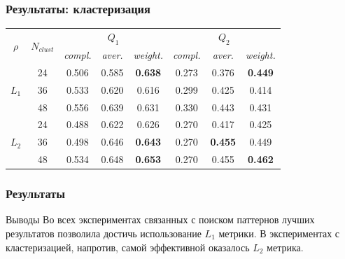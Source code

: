 \documentclass{beamer}
\begin{document}

\begin{frame}
    \frametitle{Результаты: кластеризация}   
    \begin{table}[h]
        \centering
        \begin{tabular}{c|c *{2}{|*{3}{c}}}
            \toprule
             &  &  &  \\
            \cmidrule(r){3-8}
            && \textit{compl.} & \textit{aver.} & \textit{weight.} & \textit{compl.} & \textit{aver.} & \textit{weight.} \\
            \midrule
                & 24    &   0.506  &   0.585 &    \textbf{0.638}  & 0.273   &  0.376    &   \textbf{0.449}  \\
                & 36    &   0.533  &   0.620 &    0.616  & 0.299   &  0.425    &   0.414  \\
                & 48    &   0.556  &   0.639 &    0.631  & 0.330   &  0.443    &   0.431  \\
        \midrule
                & 24    &   0.488  &   0.622 &    0.626  & 0.270   &  0.417    &   0.425  \\
                & 36    &   0.498  &   0.646 &    \textbf{0.643}  & 0.270   &  \textbf{0.455}    &   0.449  \\
                & 48    &   0.534  &   0.648 &    \textbf{0.653}  & 0.270   &  0.455    &   \textbf{0.462}  \\
        \bottomrule
        \end{tabular}
    \end{table}

\end{frame}


\begin{frame}
    \frametitle{Результаты}
    \begin{block}{Выводы}
        Во всех экспериментах связанных с поиском паттернов лучших результатов
        позволила достичь использование $L_1$ метрики. 
        В экспериментах с кластеризацией, напротив, самой эффективной оказалось 
        $L_2$ метрика.
    \end{block}
\end{frame}


\end{document}
